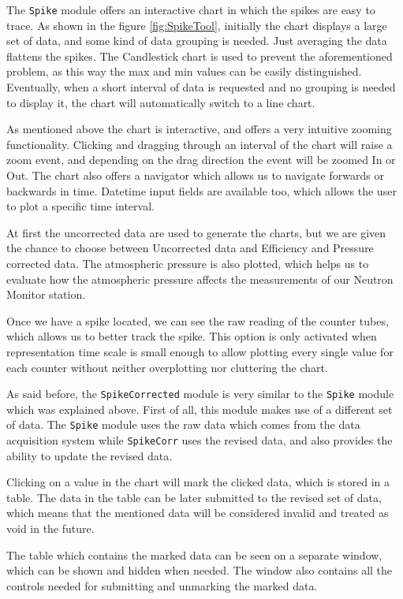 \documentclass[a4paper]{jpconf}
\begin{document}
The \texttt{Spike} module offers an interactive chart in which the spikes
are easy to trace. As shown in the figure \ref{fig:SpikeTool}, initially the
chart displays a large set of data, and some kind of data grouping is needed.
Just averaging the data flattens the spikes.  The Candlestick chart is used to
prevent the aforementioned problem, as this way the max and min values can be
easily distinguished. Eventually, when a short interval of data is requested and
no grouping is needed to display it, the chart will automatically switch to a
line chart.

As mentioned above the chart is interactive, and offers a very intuitive
zooming functionality. Clicking and dragging through an interval of the chart will
raise a zoom event, and depending on the drag direction the event will be zoomed In
or Out. The chart also offers a navigator which allows us to navigate forwards or
backwards in time. Datetime input fields are available too, which allows the user to
plot a specific time interval.

At first the uncorrected data are used to generate the charts, but we are given
the chance to choose between Uncorrected data and Efficiency and Pressure corrected
data. The atmospheric pressure is also plotted, which helps us to evaluate how the
atmospheric pressure affects the measurements of our Neutron Monitor station.

Once we have a spike located, we can see the raw reading of the counter tubes,
which allows us to better track the spike. This option is only activated when
representation time scale is small enough to allow plotting every single value
for each counter without neither overplotting nor cluttering the chart.

As said before, the \texttt{SpikeCorrected} module is very similar to the
\texttt{Spike} module which was explained above. First of all, this module makes
use of a different set of data. The \texttt{Spike} module uses the raw data which
comes from the data acquisition system while \texttt{SpikeCorr} uses the
revised data, and also provides the ability to update the revised data.

Clicking on a value in the chart will mark the clicked data, which is
stored in a table. The data in the table can be later submitted to the revised
set of data, which means that the mentioned data will be considered invalid and
treated as void in the future.

The table which contains the marked data can be seen on a separate window, which
can be shown and hidden when needed. The window also contains all the
controls needed for submitting and unmarking the marked data.
\end{document}
